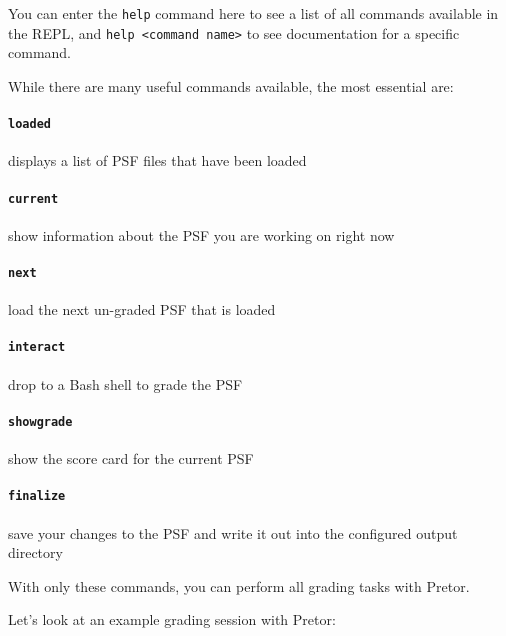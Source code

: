 \documentclass{book}
\begin{document}
You can enter the \texttt{help} command here to see a list of all commands
available in the REPL, and \texttt{help <command name>} to see documentation
for a specific command.

While there are many useful commands available, the most essential are:

\paragraph{\texttt{loaded}} displays a list of PSF files that have been loaded

\paragraph{\texttt{current}} show information about the PSF you are working on
right now

\paragraph{\texttt{next}} load the next un-graded PSF that is loaded

\paragraph{\texttt{interact}} drop to a Bash shell to grade the PSF

\paragraph{\texttt{showgrade}} show the score card for the current PSF

\paragraph{\texttt{finalize}} save your changes to the PSF and write it out
into the configured output directory

With only these commands, you can perform all grading tasks with Pretor.

Let's look at an example grading session with Pretor:
\end{document}
